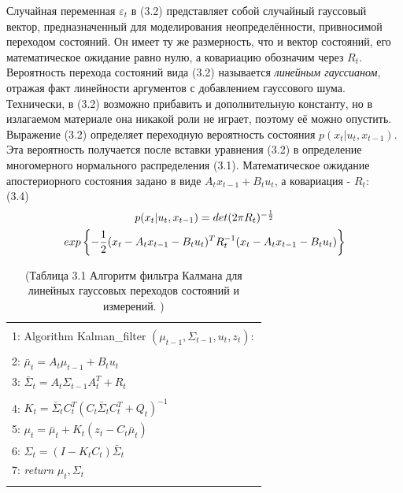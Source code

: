 \documentclass[10pt,a4paper]{article}
\begin{document}
 Случайная переменная $\varepsilon_t$ в (3.2) представляет собой случайный гауссовый вектор, предназначенный для моделирования неопределённости, привносимой переходом состояний. Он имеет ту же размерность, что и вектор состояний, его математическое ожидание равно нулю, а ковариацию обозначим через $R_t$. Вероятность перехода состояний вида (3.2) называется \textit{линейным гауссианом}, отражая факт линейности аргументов с добавлением гауссового шума. Технически, в (3.2) возможно прибавить и дополнительную константу, но в излагаемом материале она никакой роли не играет, поэтому её можно опустить.\\
 
 Выражение (3.2) определяет переходную вероятность состояния $p(x_t | u_t, x_{t-1})$. Эта вероятность получается после вставки уравнения (3.2) в определение многомерного нормального распределения (3.1). Математическое ожидание апостериорного состояния задано в виде $A_{t}x_{t-1}+B_{t}u_t$, а ковариация - $R_t$:\\
 
 (3.4)
 \begin{multline*}
 $$p(x_t|u_t,x_{t-1})=det(2\pi R_t)^{-\frac{1}{2}}\\
 exp\left\lbrace -\frac{1}{2}(x_t-A_{t}x_{t-1}-B_{t}u_t)^T R_t^{-1}(x_t-A_{t}x_{t-1}-B_{t}u_t)\right\rbrace$$ 
 \end{multline*}
 \begin{table}[h]
 \begin{center}
 \begin{tabular}{|l|}
 \hline
 {}\\
 1: \hspace{3mm} Algorithm Kalman\_filter $(\mu_{t-1},\varSigma_{t-1},u_t,z_t):$ \\
 {}\\
 2: \hspace{7mm} 
 $\bar{\mu}_t=A_t \mu_{t-1}+B_t u_t$\\
 3: \hspace{7mm} $\bar{\varSigma}_t=A_t \varSigma_{t-1}A_t^T+R_t$\\
 {}\\
 4: \hspace{7mm} $K_t=\bar{\varSigma}_t C_t^T(C_t \bar{\varSigma}_t C_t^T+Q_t)^{-1}$\\
 5: \hspace{7mm} $\mu_t=\bar{\mu}_t+K_t(z_t-C_t \bar{\mu}_t)$\\
 6: \hspace{7mm}  $\varSigma_t=(I-K_t C_t)\bar{\varSigma}_t$\\
 7: \hspace{7mm}
 \textit{return} $\mu_t,\varSigma_t$\\
 {}\\
 \hline
 \end{tabular}
 \caption{(Таблица 3.1 Алгоритм фильтра Калмана для линейных гауссовых переходов состояний и измерений. )}
 \end{center}
 \end{table}\\
\end{document}
